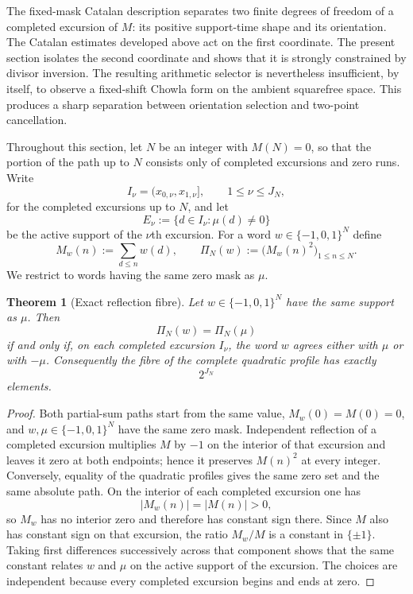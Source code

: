 \documentclass[11pt,reqno]{amsart}
\numberwithin{equation}{section}
\theoremstyle{plain}
\newtheorem{theorem}{Theorem}[section]
\theoremstyle{definition}
\theoremstyle{remark}
\begin{document}
The fixed-mask Catalan description separates two finite degrees of freedom of a completed excursion of $M$: its positive support-time shape and its orientation.  The Catalan estimates developed above act on the first coordinate.  The present section isolates the second coordinate and shows that it is strongly constrained by divisor inversion.  The resulting arithmetic selector is nevertheless insufficient, by itself, to observe a fixed-shift Chowla form on the ambient squarefree space.  This produces a sharp separation between orientation selection and two-point cancellation.

Throughout this section, let $N$ be an integer with $M(N)=0$, so that the portion of the path up to $N$ consists only of completed excursions and zero runs.  Write
\begin{equation}
I_\nu=(x_{0,\nu},x_{1,\nu}],\qquad 1\le \nu\le J_N,
\end{equation}
for the completed excursions up to $N$, and let
\begin{equation}
E_\nu:=\{d\in I_\nu:\mu(d)\ne0\}
\end{equation}
be the active support of the $\nu$th excursion.  For a word $w\in\{-1,0,1\}^N$ define
\begin{equation}
M_w(n):=\sum_{d\le n}w(d),\qquad
\Pi_N(w):=\bigl(M_w(n)^2\bigr)_{1\le n\le N}.
\end{equation}
We restrict to words having the same zero mask as $\mu$.

\begin{theorem}[Exact reflection fibre]
\label{thm:exact-reflection-fibre}
Let $w\in\{-1,0,1\}^N$ have the same support as $\mu$.  Then
\begin{equation}
\Pi_N(w)=\Pi_N(\mu)
\end{equation}
if and only if, on each completed excursion $I_\nu$, the word $w$ agrees either with $\mu$ or with $-\mu$.  Consequently the fibre of the complete quadratic profile has exactly
\begin{equation}
2^{J_N}
\end{equation}
elements.
\end{theorem}

\begin{proof}
Both partial-sum paths start from the same value, $M_w(0)=M(0)=0$, and $w,\mu\in\{-1,0,1\}^N$ have the same zero mask.  Independent reflection of a completed excursion multiplies $M$ by $-1$ on the interior of that excursion and leaves it zero at both endpoints; hence it preserves $M(n)^2$ at every integer.  Conversely, equality of the quadratic profiles gives the same zero set and the same absolute path.  On the interior of each completed excursion one has
\begin{equation}
|M_w(n)|=|M(n)|>0,
\end{equation}
so $M_w$ has no interior zero and therefore has constant sign there.  Since $M$ also has constant sign on that excursion, the ratio $M_w/M$ is a constant in $\{\pm1\}$.  Taking first differences successively across that component shows that the same constant relates $w$ and $\mu$ on the active support of the excursion.  The choices are independent because every completed excursion begins and ends at zero.
\end{proof}
\end{document}
